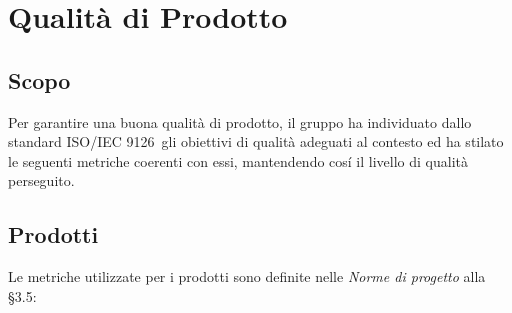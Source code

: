 \section{Qualità di Prodotto}
\subsection{Scopo}
Per garantire una buona qualità di prodotto, il gruppo ha individuato dallo standard ISO/IEC 9126\pedice~gli obiettivi di qualità adeguati al contesto ed ha stilato le seguenti metriche coerenti con essi, mantendendo cosí il livello di qualità perseguito.

\subsection{Prodotti}
Le metriche utilizzate per i prodotti sono definite nelle \textit{Norme di progetto} alla §3.5:
